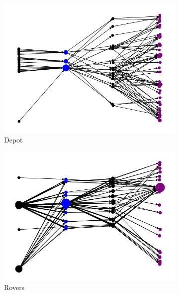\documentclass{article}
\theoremstyle{remark}
\begin{document}
\begin{figure}[t!]
\begin{subfigure}[b]{0.3\textwidth}
\centering
  \includegraphics[width=1\linewidth]{Dependencies_graphs/DepGraphDepot}
  \caption{Depot}
  \label{fig:DepGraphDepot}
\end{subfigure}\hspace{1em}
\begin{subfigure}[b]{0.3\textwidth}
\centering
  \includegraphics[width=1\linewidth]{Dependencies_graphs/DepGraphRovers}
  \caption{Rovers}
  \label{fig:DepGraphRovers}
\end{subfigure}\hspace{1em}
\begin{subfigure}[b]{0.3\textwidth}
\centering

\end{subfigure}
\end{figure}
\end{document}
